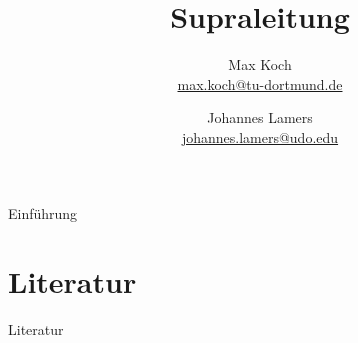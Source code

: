 \documentclass[aspectratio=1610, 9pt]{beamer}
\title{Supraleitung}
\author[M.~Koch \and J.~Lamers]{
 Max Koch\\%
 \href{mailto:max.koch@tu-dortmund.de}{max.koch@tu-dortmund.de}%
 \and%
 Johannes Lamers\\%
\href{mailto:johannes.lamers@edu.edu}{johannes.lamers@udo.edu}%
 }
\institute[Kurzform Lehrstuhl]{Names des Lehrstuhls}
\begin{document}
\maketitle

\begin{frame}{Einführung}
  \tableofcontents
\end{frame}








\section{Literatur}
\begin{frame}{Literatur}
\printbibliography{}
\end{frame}
\end{document}

